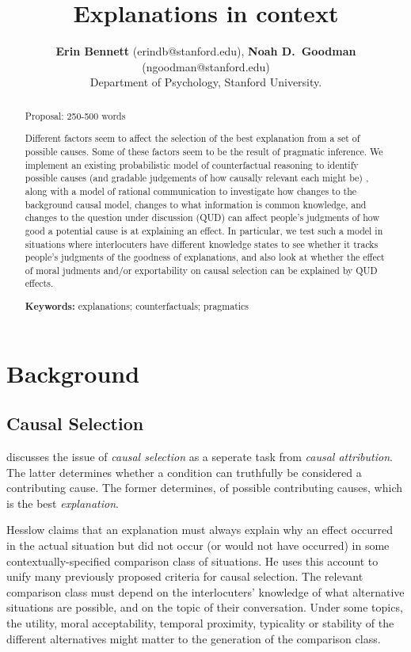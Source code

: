 \documentclass[10pt,letterpaper]{article}
\title{Explanations in context}
\author{{\large \bf Erin Bennett} (erindb@stanford.edu), {\large \bf Noah D.~Goodman} (ngoodman@stanford.edu)\\
  Department of Psychology, Stanford University.}
\begin{document}
\maketitle

\begin{abstract}

Proposal: 250-500 words

Different factors seem to affect the selection of the best explanation from a set of possible causes. Some of these factors seem to be the result of pragmatic inference. We implement an existing probabilistic model of counterfactual reasoning to identify possible causes (and gradable judgements of how causally relevant each might be) \cite{LucasKemp2015}, along with a model of rational communication \cite{FrankGoodman2012, GoodmanStuhlmuller2013} to investigate how changes to the background causal model, changes to what information is common knowledge, and changes to the question under discussion (QUD) can affect people's judgments of how good a potential cause is at explaining an effect. In particular, we test such a model in situations where interlocuters have different knowledge states to see whether it tracks people's judgments of the goodness of explanations, and also look at whether the effect of moral judments and/or exportability on causal selection can be explained by QUD effects.

\textbf{Keywords:} 
explanations; counterfactuals; pragmatics
\end{abstract}

\section{Background}

\subsection{Causal Selection}

 discusses the issue of \emph{causal selection} as a seperate task from \emph{causal attribution}.
The latter determines whether a condition can truthfully be considered a contributing cause.
The former determines, of possible contributing causes, which is the best \emph{explanation}.

Hesslow claims that an explanation must always explain why an effect occurred in the actual situation but did not occur (or would not have occurred) in some contextually-specified comparison class of situations.
He uses this account to unify many previously proposed criteria for causal selection. %
The relevant comparison class must depend on the interlocuters' knowledge of what alternative situations are possible, and on the topic of their conversation.
Under some topics, the utility, moral acceptability, temporal proximity, typicality or stability of the different alternatives might matter to the generation of the comparison class.
\end{document}
